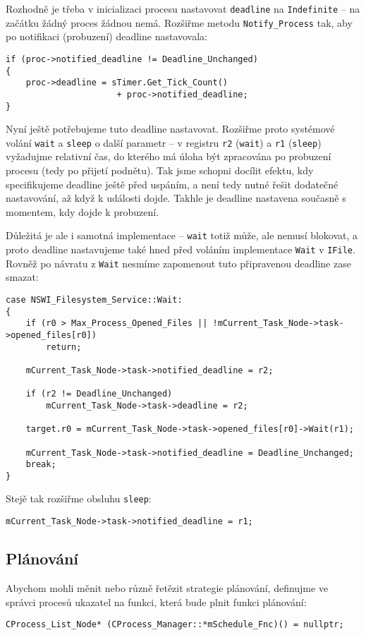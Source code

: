 \documentclass{article}
\begin{document}
Rozhodně je třeba v inicializaci procesu nastavovat \texttt{deadline} na \texttt{Indefinite} -- na začátku žádný proces žádnou nemá. Rozšiřme metodu \texttt{Notify\_Process} tak, aby po notifikaci (probuzení) deadline nastavovala:
\begin{lstlisting}
if (proc->notified_deadline != Deadline_Unchanged)
{
	proc->deadline = sTimer.Get_Tick_Count()
	                  + proc->notified_deadline;
}
\end{lstlisting}

Nyní ještě potřebujeme tuto  deadline nastavovat. Rozšiřme proto systémové volání \texttt{wait} a \texttt{sleep} o další parametr -- v registru \texttt{r2} (\texttt{wait}) a \texttt{r1} (\texttt{sleep}) vyžadujme relativní čas, do kterého má úloha být zpracována po probuzení procesu (tedy po přijetí podnětu). Tak jsme schopni docílit efektu, kdy specifikujeme deadline ještě před uspáním, a není tedy nutné řešit dodatečné nastavování, až když k události dojde. Takhle je deadline nastavena současně s momentem, kdy dojde k probuzení.

Důležitá je ale i samotná implementace -- \texttt{wait} totiž může, ale nemusí blokovat, a proto deadline nastavujeme také hned před voláním implementace \texttt{Wait} v \texttt{IFile}. Rovněž po návratu z \texttt{Wait} nesmíme zapomenout tuto připravenou deadline zase smazat:
\begin{lstlisting}
case NSWI_Filesystem_Service::Wait:
{
	if (r0 > Max_Process_Opened_Files || !mCurrent_Task_Node->task->opened_files[r0])
		return;
	
	mCurrent_Task_Node->task->notified_deadline = r2;
	
	if (r2 != Deadline_Unchanged)
		mCurrent_Task_Node->task->deadline = r2;
	
	target.r0 = mCurrent_Task_Node->task->opened_files[r0]->Wait(r1);
	
	mCurrent_Task_Node->task->notified_deadline = Deadline_Unchanged;
	break;
}
\end{lstlisting}
Stejě tak rozšiřme obsluhu \texttt{sleep}:
\begin{lstlisting}
mCurrent_Task_Node->task->notified_deadline = r1;
\end{lstlisting}

\subsection{Plánování}

Abychom mohli měnit nebo různě řetězit strategie plánování, definujme ve správci procesů ukazatel na funkci, která bude plnit funkci plánování:
\begin{lstlisting}
CProcess_List_Node* (CProcess_Manager::*mSchedule_Fnc)() = nullptr;
\end{lstlisting}
\end{document}
